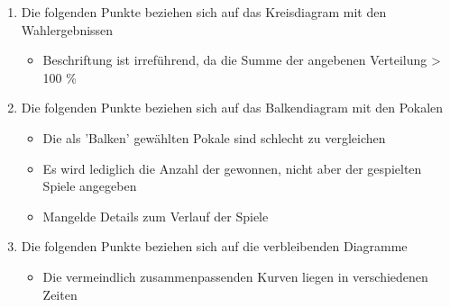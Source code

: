 \begin{enumerate}
	\item Die folgenden Punkte beziehen sich auf das Kreisdiagram mit den Wahlergebnissen
	\begin{itemize}
		\item Beschriftung ist irreführend, da die Summe der angebenen  Verteilung > 100 \%
	\end{itemize}
	\item Die folgenden Punkte beziehen sich auf das Balkendiagram mit den Pokalen
	\begin{itemize}
		\item Die als 'Balken' gewählten Pokale sind schlecht zu vergleichen
		\item Es wird lediglich die Anzahl der gewonnen, nicht aber der gespielten Spiele angegeben
		\item Mangelde Details zum Verlauf der Spiele
	\end{itemize}
	\item Die folgenden Punkte beziehen sich auf die verbleibenden Diagramme
	\begin{itemize}
		\item Die vermeindlich zusammenpassenden Kurven liegen in verschiedenen Zeiten
	\end{itemize}
\end{enumerate}
		
